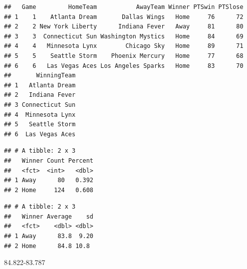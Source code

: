 \documentclass[]{article}
\newenvironment{Shaded}{\begin{snugshade}}{\end{snugshade}}
\newcommand{\DataTypeTok}[1]{\textcolor[rgb]{0.13,0.29,0.53}{#1}}
\newcommand{\FloatTok}[1]{\textcolor[rgb]{0.00,0.00,0.81}{#1}}
\newcommand{\KeywordTok}[1]{\textcolor[rgb]{0.13,0.29,0.53}{\textbf{#1}}}
\newcommand{\NormalTok}[1]{#1}
\newcommand{\OperatorTok}[1]{\textcolor[rgb]{0.81,0.36,0.00}{\textbf{#1}}}
\newcommand{\StringTok}[1]{\textcolor[rgb]{0.31,0.60,0.02}{#1}}
\begin{document}
\begin{verbatim}
##   Game         HomeTeam           AwayTeam Winner PTSwin PTSlose
## 1    1    Atlanta Dream       Dallas Wings   Home     76      72
## 2    2 New York Liberty      Indiana Fever   Away     81      80
## 3    3  Connecticut Sun Washington Mystics   Home     84      69
## 4    4   Minnesota Lynx        Chicago Sky   Home     89      71
## 5    5    Seattle Storm    Phoenix Mercury   Home     77      68
## 6    6   Las Vegas Aces Los Angeles Sparks   Home     83      70
##       WinningTeam
## 1   Atlanta Dream
## 2   Indiana Fever
## 3 Connecticut Sun
## 4  Minnesota Lynx
## 5   Seattle Storm
## 6  Las Vegas Aces
\end{verbatim}

\begin{Shaded}
\end{Shaded}

\begin{verbatim}
## # A tibble: 2 x 3
##   Winner Count Percent
##   <fct>  <int>   <dbl>
## 1 Away      80   0.392
## 2 Home     124   0.608
\end{verbatim}

\begin{Shaded}
\end{Shaded}

\begin{verbatim}
## # A tibble: 2 x 3
##   Winner Average    sd
##   <fct>    <dbl> <dbl>
## 1 Away      83.8  9.20
## 2 Home      84.8 10.8
\end{verbatim}

\begin{Shaded}
\begin{Highlighting}[]
\FloatTok{84.822-83.787}
\end{Highlighting}
\end{Shaded}
\end{document}
